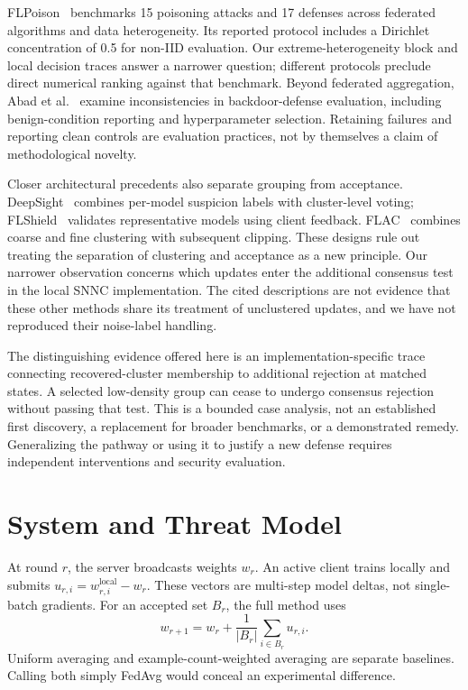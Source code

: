 \documentclass[journal]{IEEEtran}
\begin{document}
FLPoison~\cite{zhang2025flpoison} benchmarks 15 poisoning attacks and 17 defenses across federated algorithms and data heterogeneity. Its reported protocol includes a Dirichlet concentration of 0.5 for non-IID evaluation. Our extreme-heterogeneity block and local decision traces answer a narrower question; different protocols preclude direct numerical ranking against that benchmark. Beyond federated aggregation, Abad et al.~\cite{abad2025evaluation} examine inconsistencies in backdoor-defense evaluation, including benign-condition reporting and hyperparameter selection. Retaining failures and reporting clean controls are evaluation practices, not by themselves a claim of methodological novelty.

Closer architectural precedents also separate grouping from acceptance. DeepSight~\cite{rieger2022deepsight} combines per-model suspicion labels with cluster-level voting; FLShield~\cite{kabir2023flshield} validates representative models using client feedback. FLAC~\cite{yuan2025flac} combines coarse and fine clustering with subsequent clipping. These designs rule out treating the separation of clustering and acceptance as a new principle. Our narrower observation concerns which updates enter the additional consensus test in the local SNNC implementation. The cited descriptions are not evidence that these other methods share its treatment of unclustered updates, and we have not reproduced their noise-label handling.

The distinguishing evidence offered here is an implementation-specific trace connecting recovered-cluster membership to additional rejection at matched states. A selected low-density group can cease to undergo consensus rejection without passing that test. This is a bounded case analysis, not an established first discovery, a replacement for broader benchmarks, or a demonstrated remedy. Generalizing the pathway or using it to justify a new defense requires independent interventions and security evaluation.

\section{System and Threat Model}
At round $r$, the server broadcasts weights $w_r$. An active client trains locally and submits $u_{r,i}=w^{\mathrm{local}}_{r,i}-w_r$. These vectors are multi-step model deltas, not single-batch gradients. For an accepted set $B_r$, the full method uses
\begin{equation}
w_{r+1}=w_r+\frac{1}{|B_r|}\sum_{i\in B_r}u_{r,i}.
\end{equation}
Uniform averaging and example-count-weighted averaging are separate baselines. Calling both simply FedAvg would conceal an experimental difference.
\end{document}
